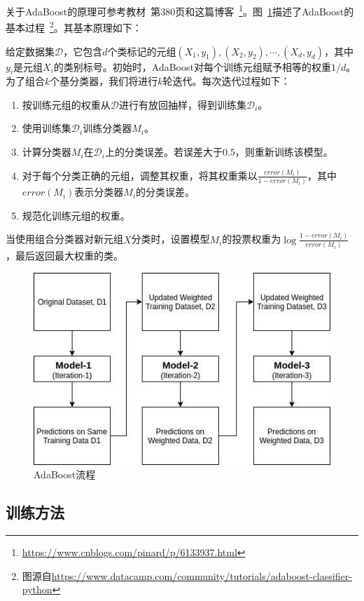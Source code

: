 \documentclass[12pt]{article} %
\newcommand\calD{\mathcal{D}}
\newcommand\XX{\boldsymbol{\mathit{X}}}
\begin{document}
\begin{sloppypar}
关于AdaBoost的原理可参考教材~\cite{han2011data}第380页和这篇博客~\footnote{\url{https://www.cnblogs.com/pinard/p/6133937.html}}。图~\ref{fig:AdaBoost}描述了AdaBoost的基本过程~\footnote{图源自\url{https://www.datacamp.com/community/tutorials/adaboost-classifier-python}}。其基本原理如下：

给定数据集$\calD$，它包含$d$个类标记的元组$(\XX_1, y_1), (\XX_2, y_2), \cdots, (\XX_d, y_d)$，其中$y_i$是元组$\XX_i$的类别标号。初始时，AdaBoost对每个训练元组赋予相等的权重$1/d$。为了组合$k$个基分类器，我们将进行$k$轮迭代。每次迭代过程如下：
\begin{enumerate}
\item 按训练元组的权重从$\calD$进行有放回抽样，得到训练集$\calD_i$。
\item 使用训练集$\calD_i$训练分类器$M_i$。
\item 计算分类器$M_i$在$\calD_i$上的分类误差。若误差大于$0.5$，则重新训练该模型。
\item 对于每个分类正确的元组，调整其权重，将其权重乘以$\frac{error(M_i)}{1 - error(M_i)}$，其中$error(M_i)$表示分类器$M_i$的分类误差。
\item 规范化训练元组的权重。
\end{enumerate}

当使用组合分类器对新元组$\XX$分类时，设置模型$M_i$的投票权重为$\log\frac{1-error(M_i)}{error(M_i)}$，最后返回最大权重的类。

\begin{figure}[htbp]
	\centering
	\includegraphics[width=0.85\linewidth]{figure/AdaBoost.jpg}
	\caption{AdaBoost流程}
	\label{fig:AdaBoost}
\end{figure}

\subsection{训练方法}


\end{sloppypar}
\end{document}
